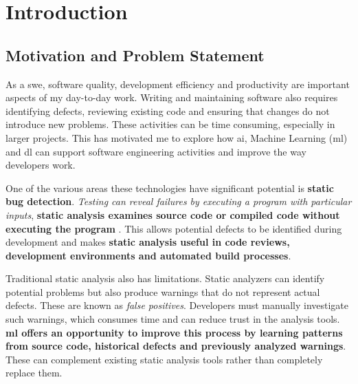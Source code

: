 \newpage
\section{Introduction} \label{sec:introduction}




\subsection{Motivation and Problem Statement}

\hspace{0.6em} As a \gls{swe}, software quality, development efficiency and productivity are important aspects of my day-to-day work. Writing and maintaining software also requires identifying defects, reviewing existing code and ensuring that changes do not introduce new problems. These activities can be time consuming, especially in larger projects. This has motivated me to explore how \gls{ai}, Machine Learning (\gls{ml}) and \gls{dl} can support software engineering activities and improve the way developers work.

\hspace{0.6em} One of the various areas these technologies have significant potential is \textbf{static bug detection}. \textit{Testing can reveal failures by executing a program with particular inputs}, \textbf{static analysis examines source code or compiled code without executing the program} \cite{paperreference1_ayewah2008using}. This allows potential defects to be identified during development and makes \textbf{static analysis useful in code reviews, development environments and automated build processes}.

\hspace{0.6em} Traditional static analysis also has limitations. Static analyzers can identify potential problems but also produce warnings that do not represent actual defects. These are known as \emph{false positives}. Developers must manually investigate such warnings, which consumes time and can reduce trust in the analysis tools. \textbf{\gls{ml} offers an opportunity to improve this process by learning patterns from source code, historical defects and previously analyzed warnings}. These can complement existing static analysis tools rather than completely replace them.

